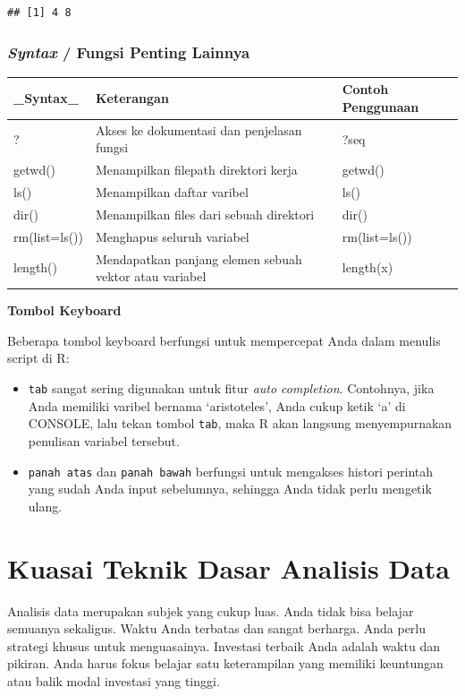 \documentclass[openany]{book}
\begin{document}
\begin{verbatim}
## [1] 4 8
\end{verbatim}

\subsection{\texorpdfstring{\emph{Syntax} / Fungsi Penting
Lainnya}{Syntax / Fungsi Penting Lainnya}}\label{syntax-fungsi-penting-lainnya}

\begin{tabular}{l|l|l}
\hline
\_Syntax\_ & Keterangan & Contoh Penggunaan\\
\hline
? & Akses ke dokumentasi dan penjelasan fungsi & ?seq\\
\hline
getwd() & Menampilkan filepath direktori kerja & getwd()\\
\hline
ls() & Menampilkan daftar varibel & ls()\\
\hline
dir() & Menampilkan files dari sebuah direktori & dir()\\
\hline
rm(list=ls()) & Menghapus seluruh variabel & rm(list=ls())\\
\hline
length() & Mendapatkan panjang elemen sebuah vektor atau variabel & length(x)\\
\hline
\end{tabular}

\textbf{Tombol Keyboard}

Beberapa tombol keyboard berfungsi untuk mempercepat Anda dalam menulis
script di R:

\begin{itemize}
\item
  \texttt{tab} sangat sering digunakan untuk fitur \emph{auto
  completion}. Contohnya, jika Anda memiliki varibel bernama
  `aristoteles', Anda cukup ketik `a' di CONSOLE, lalu tekan tombol
  \texttt{tab}, maka R akan langsung menyempurnakan penulisan variabel
  tersebut.
\item
  \texttt{panah\ atas} dan \texttt{panah\ bawah} berfungsi untuk
  mengakses histori perintah yang sudah Anda input sebelumnya, sehingga
  Anda tidak perlu mengetik ulang.
\end{itemize}

\chapter{Kuasai Teknik Dasar Analisis
Data}\label{kuasai-teknik-dasar-analisis-data}

Analisis data merupakan subjek yang cukup luas. Anda tidak bisa belajar
semuanya sekaligus. Waktu Anda terbatas dan sangat berharga. Anda perlu
strategi khusus untuk menguasainya. Investasi terbaik Anda adalah waktu
dan pikiran. Anda harus fokus belajar satu keterampilan yang memiliki
keuntungan atau balik modal investasi yang tinggi.
\end{document}
